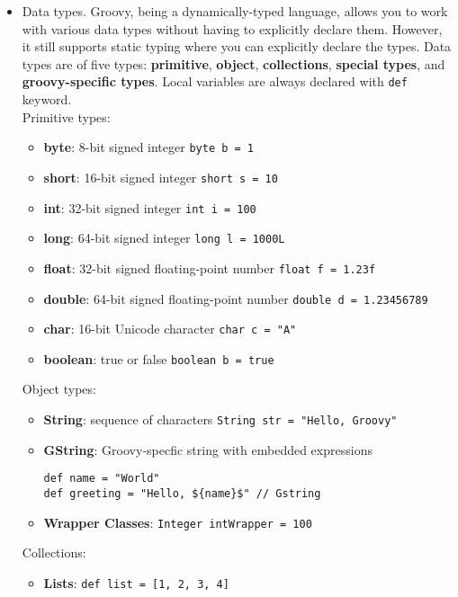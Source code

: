 \documentclass[letterpaper,11pt]{article}
\begin{document}
\begin{itemize}
    \item Data types. Groovy, being a dynamically-typed language, allows you to work with various data types without having to explicitly declare them. However, it still supports static typing where you can explicitly declare the types. Data types are of five types: \textbf{primitive}, \textbf{object}, \textbf{collections}, \textbf{special types}, and \textbf{groovy-specific types}. Local variables are always declared with \texttt{def} keyword.\\
    Primitive types:
    \begin{itemize}
        \item \textbf{byte}: 8-bit signed integer \texttt{byte b = 1}
        \item \textbf{short}: 16-bit signed integer \texttt{short s = 10}
        \item \textbf{int}: 32-bit signed integer \texttt{int i = 100}
        \item \textbf{long}: 64-bit signed integer \texttt{long l = 1000L}
        \item \textbf{float}: 32-bit signed floating-point number \texttt{float f = 1.23f}
        \item \textbf{double}: 64-bit signed floating-point number \texttt{double d = 1.23456789}
        \item \textbf{char}: 16-bit Unicode character \texttt{char c = "A"}
        \item \textbf{boolean}: true or false \texttt{boolean b = true}
    \end{itemize}
    Object types:
    \begin{itemize}
        \item \textbf{String}: sequence of characters \texttt{String str = "Hello, Groovy"}
        \item \textbf{GString}: Groovy-specfic string with embedded expressions
        \begin{verbatim}
def name = "World"
def greeting = "Hello, ${name}$" // Gstring
        \end{verbatim}
        \item \textbf{Wrapper Classes}: \texttt{Integer intWrapper = 100}
    \end{itemize}
Collections:
    \begin{itemize}
        \item \textbf{Lists}: \texttt{def list = [1, 2, 3, 4]}

\end{itemize}
\end{itemize}
\end{document}
